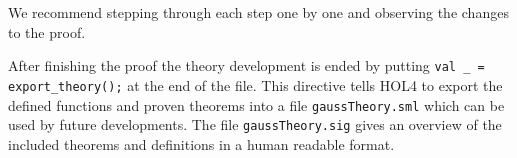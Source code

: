 We recommend stepping through each step one by one and observing the changes to
the proof.

After finishing the proof the theory development is ended by putting
\lstinline{val _ = export_theory();} at the end of the file.
This directive tells HOL4 to export the defined functions and proven theorems
into a file \texttt{gaussTheory.sml} which can be used by future developments.
The file \texttt{gaussTheory.sig} gives an overview of the included theorems and
definitions in a human readable format.